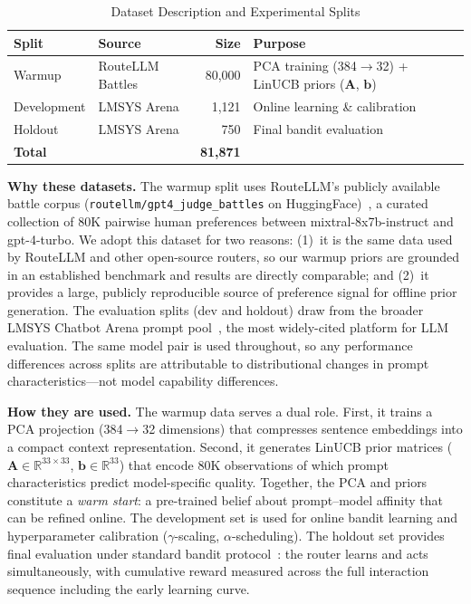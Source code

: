 
\begin{table}[t]
\centering
\caption{Dataset Description and Experimental Splits}
\label{tab:dataset}
\small
\begin{tabular}{@{}llrl@{}}
\toprule
\textbf{Split} & \textbf{Source} & \textbf{Size} & \textbf{Purpose} \\
\midrule
Warmup          & RouteLLM Battles & 80,000 & PCA training (384$\rightarrow$32) + LinUCB priors ($\mathbf{A}$, $\mathbf{b}$) \\
Development     & LMSYS Arena      & 1,121 & Online learning \& calibration \\
Holdout         & LMSYS Arena      & 750 & Final bandit evaluation \\
\midrule
\textbf{Total} & & \textbf{81,871} & \\
\bottomrule
\end{tabular}

\vspace{0.8em}
\footnotesize

\textbf{Why these datasets.}
The warmup split uses RouteLLM's publicly available battle corpus (\texttt{routellm/gpt4\_judge\_battles} on HuggingFace)~\cite{ong2024routellm}, a curated collection of 80K pairwise human preferences between mixtral-8x7b-instruct and gpt-4-turbo.
We adopt this dataset for two reasons: (1)~it is the same data used by RouteLLM and other open-source routers, so our warmup priors are grounded in an established benchmark and results are directly comparable; and (2)~it provides a large, publicly reproducible source of preference signal for offline prior generation.
The evaluation splits (dev and holdout) draw from the broader LMSYS Chatbot Arena prompt pool~\cite{zheng2023lmsys}, the most widely-cited platform for LLM evaluation.
The same model pair is used throughout, so any performance differences across splits are attributable to distributional changes in prompt characteristics---not model capability differences.

\textbf{How they are used.}
The warmup data serves a dual role.
First, it trains a PCA projection (384$\rightarrow$32 dimensions) that compresses sentence embeddings into a compact context representation.
Second, it generates LinUCB prior matrices ($\mathbf{A} \in \mathbb{R}^{33 \times 33}$, $\mathbf{b} \in \mathbb{R}^{33}$) that encode 80K observations of which prompt characteristics predict model-specific quality.
Together, the PCA and priors constitute a \emph{warm start}: a pre-trained belief about prompt--model affinity that can be refined online.
The development set is used for online bandit learning and hyperparameter calibration ($\gamma$-scaling, $\alpha$-scheduling).
The holdout set provides final evaluation under standard bandit protocol~\cite{lattimore2020bandit}: the router learns and acts simultaneously, with cumulative reward measured across the full interaction sequence including the early learning curve.


\end{table}
